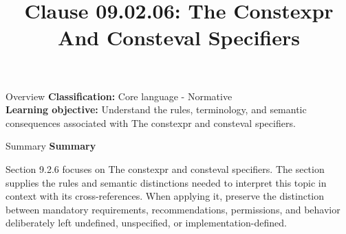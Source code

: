 \documentclass[10pt,letterpaper]{article}
\title{Clause 09.02.06: The Constexpr And Consteval Specifiers}
\author{}
\date{}
\begin{document}
\maketitle
\begin{CornellOverviewBox}{Overview}
\textbf{Classification:} Core language - Normative\\[2pt]
\textbf{Learning objective:} Understand the rules, terminology, and semantic consequences associated with The constexpr and consteval specifiers.
\end{CornellOverviewBox}\begin{CornellSummaryBox}{Summary}
{\sffamily\bfseries\color{Accent} Summary}\par\vspace{3pt}Section 9.2.6 focuses on The constexpr and consteval specifiers. The section supplies the rules and semantic distinctions needed to interpret this topic in context with its cross-references. When applying it, preserve the distinction between mandatory requirements, recommendations, permissions, and behavior deliberately left undefined, unspecified, or implementation-defined.
\end{CornellSummaryBox}
\end{document}
